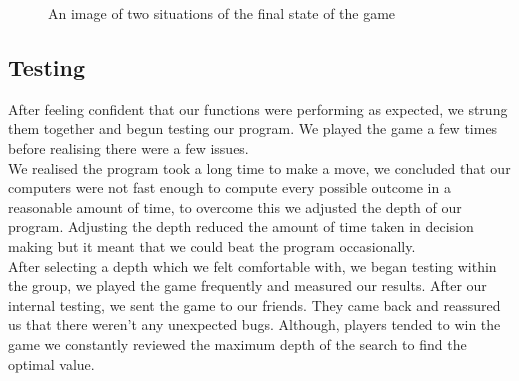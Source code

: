 \documentclass[10pt]{article}
\begin{document}
\begin{figure}%
	\centering
    \qquad
    \caption{An image of two situations of the final state of the game}%
\end{figure}


\subsection{Testing}
After feeling confident that our functions were performing as expected, we strung them together and begun testing our program. We played the game a few times before realising there were a few issues.
\\We realised the program took a long time to make a move, we concluded that our computers were not fast enough to compute every possible outcome in a reasonable amount of time, to overcome this we adjusted the depth of our program. Adjusting the depth reduced the amount of time taken in decision making but it meant that we could beat the program occasionally. 
\\After selecting a depth which we felt comfortable with, we began testing within the group, we played the game frequently and measured our results. After our internal testing, we sent the game to our friends. They came back and reassured us that there weren't any unexpected bugs. Although, players tended to win the game we constantly reviewed the maximum depth of the search to find the optimal value.
\end{document}
